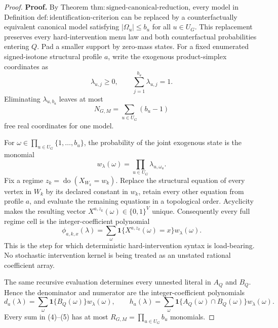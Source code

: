 \documentclass{article}
\begin{document}
\begin{proof}
\textbf{Proof.}
By Theorem \(\mathrm{thm:signed\text{-}canonical\text{-}reduction}\), every model in Definition \(\mathrm{def:identification\text{-}criterion}\) can be replaced by a counterfactually equivalent canonical model satisfying \(|\Omega_u|\le b_u\) for all \(u\in U_G\).  This replacement preserves every hard-intervention menu law and both counterfactual probabilities entering \(Q\).  Pad a smaller support by zero-mass states.  For a fixed enumerated signed-isotone structural profile \(a\), write the exogenous product-simplex coordinates as
\[
 \lambda_{u,j}\ge0,
 \qquad
 \sum_{j=1}^{b_u}\lambda_{u,j}=1.
\tag{1}
\]
Eliminating \(\lambda_{u,b_u}\) leaves at most
\[
 N_{G,M}=\sum_{u\in U_G}(b_u-1)
\tag{2}
\]
free real coordinates for one model.

For \(\omega\in\prod_{u\in U_G}\{1,\ldots,b_u\}\), the probability of the joint exogenous state is the monomial
\[
 w_\lambda(\omega)=\prod_{u\in U_G}\lambda_{u,\omega_u}.
\tag{3}
\]
Fix a regime \(z_k=\operatorname{do}(X_{W_k}=w_k)\).  Replace the structural equation of every vertex in \(W_k\) by its declared constant in \(w_k\), retain every other equation from profile \(a\), and evaluate the remaining equations in a topological order.  Acyclicity makes the resulting vector \(X^{a,z_k}(\omega)\in\{0,1\}^{V}\) unique.  Consequently every full regime cell is the integer-coefficient polynomial
\[
 \phi_{a,k,x}(\lambda)
 =\sum_{\omega}
   \mathbf 1\{X^{a,z_k}(\omega)=x\}
   w_\lambda(\omega).
\tag{4}
\]
This is the step for which deterministic hard-intervention syntax is load-bearing.  No stochastic intervention kernel is being treated as an unstated rational coefficient array.

The same recursive evaluation determines every unnested literal in \(A_Q\) and \(B_Q\).  Hence the denominator and numerator are the integer-coefficient polynomials
\[
 d_a(\lambda)
 =\sum_{\omega}\mathbf 1\{B_Q(\omega)\}w_\lambda(\omega),
 \qquad
 h_a(\lambda)
 =\sum_{\omega}\mathbf 1\{A_Q(\omega)\cap B_Q(\omega)\}w_\lambda(\omega).
\tag{5}
\]
Every sum in (4)--(5) has at most
\(
 R_{G,M}=\prod_{u\in U_G}b_u
\)
monomials.


\end{proof}
\end{document}
